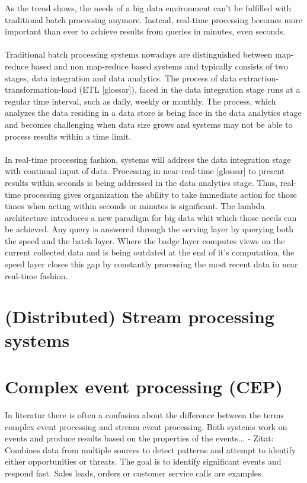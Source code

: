 As the trend shows, the needs of a big data environment can't be fulfilled with 
traditional batch processing anymore. Instead, real-time processing becomes more 
important than ever to achieve results from queries in minutes, even seconds. 
\cite{bange2013big}
\\ \\
Traditional batch processing systems nowadays are distinguished between
map-reduce based and non map-reduce based systems and typically consists of two
stages, data integration and data analytics. The process of data
extraction-transformation-load (ETL  [glossar]), faced in the data integration stage runs
at a regular time interval, such as daily, weekly or monthly. The process, which
analyzes the data residing in a data store is being face in the data analytics
stage and becomes challenging when data size grows and systems may not be able
to process results within a time limit.\cite{Liu:2014:SRP:2628194.2628251}
\\ \\
In real-time processing fashion, systems will address the data integration stage
with continual input of data. Processing in near-real-time [glossar] to present 
results within seconds is being addressed in the data analytics stage. Thus,
real-time processing gives organization the ability to take immediate action
for those times when acting within seconds or minutes is significant.
\cite{PrpSvyOfDSPS}
The lambda architecture introduces a new
paradigm for big data whit which those needs can be achieved. Any query is
answered through the serving layer by querying both the speed and the batch
layer. Where the badge layer computes views on the current collected data and
is being outdated at the end of it's computation, the speed layer closes this 
gap by constantly processing the most recent data in near real-time fashion. 
\cite{marz2015big}
\\


\section{(Distributed) Stream processing systems}

\section{Complex event processing (CEP)}
In literatur there is often a confusion about the difference between the terms
complex event processing and stream event processing. Both systems work on
events and produce results based on the properties of the events... 
- Zitat: Combines data from multiple sources  to detect patterns and attempt to
identify either opportunities or threats. The goal is to identify significant
events and respond fast. Sales leads, orders or customer service calls are
examples.\\


